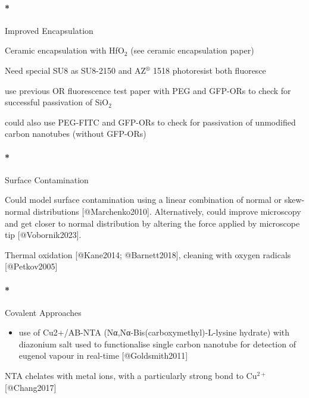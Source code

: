 \documentclass[
  letterpaper,
  DIV=11,
  numbers=noendperiod]{scrartcl}
\let\oldparagraph\paragraph
\renewcommand{\paragraph}[1]{\oldparagraph{#1}\mbox{}}
\providecommand{\tightlist}{%
  \setlength{\itemsep}{0pt}\setlength{\parskip}{0pt}}\usepackage{longtable,booktabs,array}
\begin{document}
\hypertarget{improved-encapsulation}{%
\paragraph*{Improved Encapsulation}\label{improved-encapsulation}}

Ceramic encapsulation with HfO\(_2\) (see ceramic encapsulation paper)

Need special SU8 as SU8-2150 and AZ\(^\circledR\) 1518 photoresist both
fluoresce

use previous OR fluorescence test paper with PEG and GFP-ORs to check
for successful passivation of SiO\(_2\)

could also use PEG-FITC and GFP-ORs to check for passivation of
unmodified carbon nanotubes (without GFP-ORs)

\hypertarget{surface-contamination}{%
\paragraph*{Surface Contamination}\label{surface-contamination}}

Could model surface contamination using a linear combination of normal
or skew-normal distributions {[}@Marchenko2010{]}. Alternatively, could
improve microscopy and get closer to normal distribution by altering the
force applied by microscope tip {[}@Vobornik2023{]}.

Thermal oxidation {[}@Kane2014; @Barnett2018{]}, cleaning with oxygen
radicals {[}@Petkov2005{]}

\hypertarget{covalent-approaches}{%
\paragraph*{Covalent Approaches}\label{covalent-approaches}}

\begin{itemize}
\tightlist
\item
  use of Cu2+/AB-NTA (Nα,Nα-Bis(carboxymethyl)-L-lysine hydrate) with
  diazonium salt used to functionalise single carbon nanotube for
  detection of eugenol vapour in real-time {[}@Goldsmith2011{]}
\end{itemize}

NTA chelates with metal ions, with a particularly strong bond to
Cu\(^{2+}\) {[}@Chang2017{]}
\end{document}
